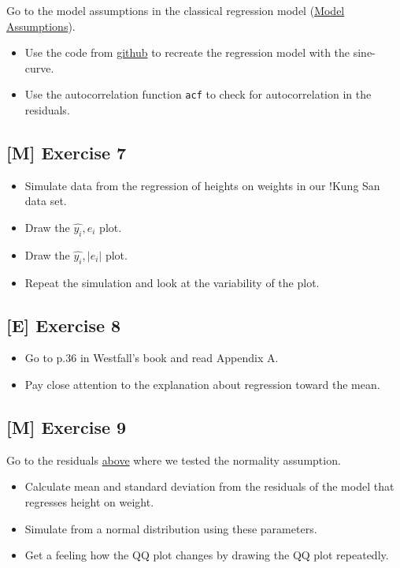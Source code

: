 \documentclass[
]{book}
\providecommand{\tightlist}{%
  \setlength{\itemsep}{0pt}\setlength{\parskip}{0pt}}
\begin{document}
Go to the model assumptions in the classical regression model (\hyperref[_model_assumptions]{Model Assumptions}).

\begin{itemize}
\item
  Use the code from \href{https://github.com/jdegenfellner/Script_QM2_ZHAW/blob/main/02-Simple_Linear_Regression.Rmd}{github}
  to recreate the regression model with the sine-curve.
\item
  Use the autocorrelation function \texttt{acf} to check for autocorrelation in the residuals.
\end{itemize}

\subsection{{[}M{]} Exercise 7}\label{exercise7_simpl_lin_reg}

\begin{itemize}
\tightlist
\item
  Simulate data from the regression of heights on weights in our !Kung San data set.
\item
  Draw the \(\hat{y_i}, e_i\) plot.
\item
  Draw the \(\hat{y_i}, |e_i|\) plot.
\item
  Repeat the simulation and look at the variability of the plot.
\end{itemize}

\subsection{{[}E{]} Exercise 8}\label{exercise8_simpl_lin_reg}

\begin{itemize}
\tightlist
\item
  Go to p.36 in Westfall's book and read Appendix A.
\item
  Pay close attention to the explanation about regression toward the mean.
\end{itemize}

\subsection{{[}M{]} Exercise 9}\label{exercise9_simpl_lin_reg}

Go to the residuals \hyperref[normality_assumption]{above} where we tested the normality assumption.

\begin{itemize}
\tightlist
\item
  Calculate mean and standard deviation from the residuals of the model
  that regresses height on weight.
\item
  Simulate from a normal distribution using these parameters.
\item
  Get a feeling how the QQ plot changes by drawing the QQ plot repeatedly.
\end{itemize}
\end{document}

